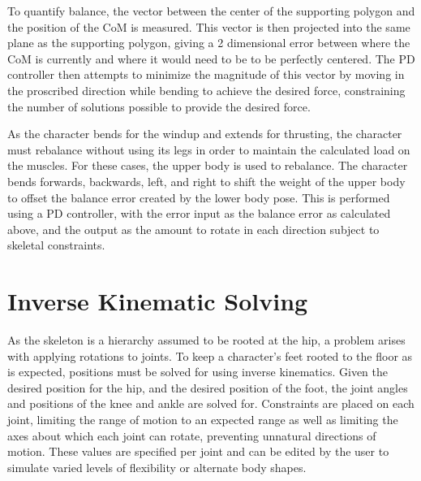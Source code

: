 To quantify balance, the vector between the center of the supporting polygon and the position of the CoM is measured.  This vector is then projected into the same plane as the supporting polygon, giving a 2 dimensional error between where the CoM is currently and where it would need to be to be perfectly centered.  The PD controller then attempts to minimize the magnitude of this vector by moving in the proscribed direction while bending to achieve the desired force, constraining the number of solutions possible to provide the desired force.


As the character bends for the windup and extends for thrusting, the character must rebalance without using its legs in order to maintain the calculated load on the muscles.  For these cases, the upper body is used to rebalance.  The character bends forwards, backwards, left, and right to shift the weight of the upper body to offset the balance error created by the lower body pose.  This is performed using a PD controller, with the error input as the balance error as calculated above, and the output as the amount to rotate in each direction subject to skeletal constraints.

\section{Inverse Kinematic Solving}
\label{section:ik}
As the skeleton is a hierarchy assumed to be rooted at the hip, a problem arises with applying rotations to joints.  To keep a character's feet rooted to the floor as is expected, positions must be solved for using inverse kinematics.  Given the desired position for the hip, and the desired position of the foot, the joint angles and positions of the knee and ankle are solved for.  Constraints are placed on each joint, limiting the range of motion to an expected range as well as limiting the axes about which each joint can rotate, preventing unnatural directions of motion.  These values are specified per joint and can be edited by the user to simulate varied levels of flexibility or alternate body shapes.


